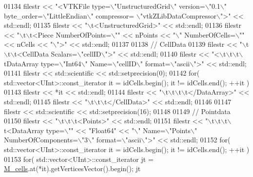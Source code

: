 \begin{DoxyCode}
01134     filestr << \textcolor{stringliteral}{"<VTKFile type=\(\backslash\)"UnstructuredGrid\(\backslash\)" version=\(\backslash\)"0.1\(\backslash\)" byte\_order=\(\backslash\)"LittleEndian\(\backslash\)" compressor=
      \(\backslash\)"vtkZLibDataCompressor\(\backslash\)">"} << std::endl;
01135     filestr << \textcolor{stringliteral}{"\(\backslash\)t<UnstructuredGrid>"} << std::endl;
01136     filestr << \textcolor{stringliteral}{"\(\backslash\)t\(\backslash\)t<Piece NumberOfPoints=\(\backslash\)""} << nPoints << \textcolor{stringliteral}{"\(\backslash\)" NumberOfCells=\(\backslash\)""} << nCells << \textcolor{stringliteral}{"\(\backslash\)">"} << 
      std::endl;
01137 
01138     \textcolor{comment}{// CellData}
01139     filestr << \textcolor{stringliteral}{"\(\backslash\)t\(\backslash\)t\(\backslash\)t<CellData Scalars=\(\backslash\)"cellID\(\backslash\)">"} << std::endl;
01140     filestr << \textcolor{stringliteral}{"<\(\backslash\)t\(\backslash\)t\(\backslash\)t\(\backslash\)tDataArray type=\(\backslash\)"Int64\(\backslash\)" Name=\(\backslash\)"cellID\(\backslash\)" format=\(\backslash\)"ascii\(\backslash\)">"} << std::endl;
01141     filestr << std::scientific << std::setprecision(0);
01142     \textcolor{keywordflow}{for}( std::vector<UInt>::const\_iterator it = idCells.begin(); it != idCells.end(); ++it )
01143         filestr << *it << std::endl;
01144     filestr << \textcolor{stringliteral}{"\(\backslash\)t\(\backslash\)t\(\backslash\)t\(\backslash\)t</DataArray>"} << std::endl;
01145     filestr << \textcolor{stringliteral}{"\(\backslash\)t\(\backslash\)t\(\backslash\)t</CellData>"} << std::endl;
01146 
01147     filestr << std::scientific << std::setprecision(16);
01148 
01149     \textcolor{comment}{// Pointdata}
01150     filestr << \textcolor{stringliteral}{"\(\backslash\)t\(\backslash\)t\(\backslash\)t<Points>"} << std::endl;
01151     filestr << \textcolor{stringliteral}{"\(\backslash\)t\(\backslash\)t\(\backslash\)t\(\backslash\)t<DataArray type=\(\backslash\)""} << \textcolor{stringliteral}{"Float64"} << \textcolor{stringliteral}{"\(\backslash\)" Name=\(\backslash\)"Points\(\backslash\)" NumberOfComponents=\(\backslash\)"3\(\backslash\)"
       format=\(\backslash\)"ascii\(\backslash\)">"} << std::endl;
01152     \textcolor{keywordflow}{for}( std::vector<UInt>::const\_iterator it = idCells.begin(); it != idCells.end(); ++it )
01153         \textcolor{keywordflow}{for}( std::vector<UInt>::const\_iterator jt = \hyperlink{classFVCode3D_1_1Mesh3D_a8cac877e809226fb96078183efb25a2f}{M\_cells}.at(*it).getVerticesVector().begin(); jt 

\end{DoxyCode}

